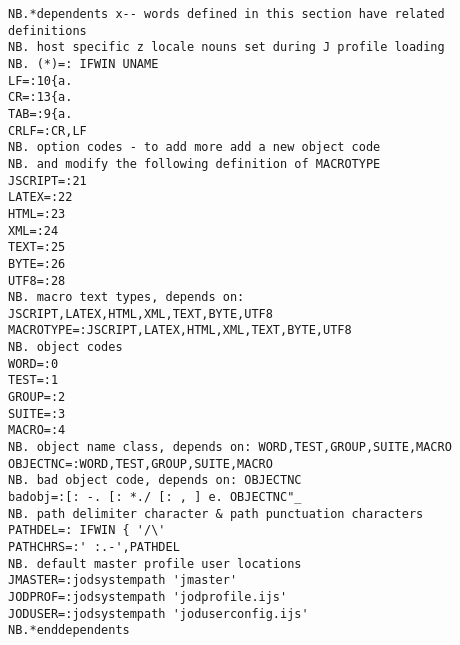 \begin{lstlisting}[frame=single,framerule=0pt,basicstyle=\ttfamily\footnotesize]
NB.*dependents x-- words defined in this section have related definitions
NB. host specific z locale nouns set during J profile loading
NB. (*)=: IFWIN UNAME
LF=:10{a.
CR=:13{a.
TAB=:9{a.
CRLF=:CR,LF
NB. option codes - to add more add a new object code
NB. and modify the following definition of MACROTYPE
JSCRIPT=:21
LATEX=:22
HTML=:23
XML=:24
TEXT=:25
BYTE=:26
UTF8=:28
NB. macro text types, depends on: JSCRIPT,LATEX,HTML,XML,TEXT,BYTE,UTF8
MACROTYPE=:JSCRIPT,LATEX,HTML,XML,TEXT,BYTE,UTF8
NB. object codes
WORD=:0
TEST=:1
GROUP=:2
SUITE=:3
MACRO=:4
NB. object name class, depends on: WORD,TEST,GROUP,SUITE,MACRO
OBJECTNC=:WORD,TEST,GROUP,SUITE,MACRO
NB. bad object code, depends on: OBJECTNC
badobj=:[: -. [: *./ [: , ] e. OBJECTNC"_
NB. path delimiter character & path punctuation characters
PATHDEL=: IFWIN { '/\'
PATHCHRS=:' :.-',PATHDEL
NB. default master profile user locations
JMASTER=:jodsystempath 'jmaster'
JODPROF=:jodsystempath 'jodprofile.ijs'
JODUSER=:jodsystempath 'joduserconfig.ijs'
NB.*enddependents
\end{lstlisting}

